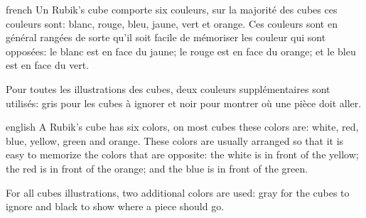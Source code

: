 \documentclass[0_Main.tex]{subfiles}
\begin{document}
\begin{shownto}{french}
Un Rubik's cube comporte six couleurs, sur la majorité des cubes ces couleurs sont: \colorbox{cblack}{\textcolor{cwhite}{blanc}}, \textcolor{cred}{rouge}, \textcolor{cblue}{bleu}, \textcolor{cyellow}{jaune}, \textcolor{cgreen}{vert} et \textcolor{corange}{orange}. Ces couleurs sont en général rangées de sorte qu'il soit facile de mémoriser les couleur qui sont opposées: le \colorbox{cblack}{\textcolor{cwhite}{blanc}} est en face du \textcolor{cyellow}{jaune}; le \textcolor{cred}{rouge} est en face du \textcolor{corange}{orange}; et le \textcolor{cblue}{bleu} est en face du \textcolor{cgreen}{vert}.

Pour toutes les illustrations des cubes, deux couleurs supplémentaires sont utilisés: \textcolor{cgray}{gris} pour les cubes à ignorer et \textcolor{cblack}{noir} pour montrer où une pièce doit aller.
\end{shownto}

\begin{shownto}{english}
A Rubik's cube has six colors, on most cubes these colors are: \colorbox{cblack}{\textcolor{cwhite}{white}}, \textcolor{cred}{red}, \textcolor{cblue}{blue}, \textcolor{cyellow}{yellow}, \textcolor{cgreen}{green} and \textcolor{corange}{orange}. These colors are usually arranged so that it is easy to memorize the colors that are opposite: the \colorbox{cblack}{\textcolor{cwhite}{white}} is in front of the \textcolor{cyellow}{yellow}; the \textcolor{cred}{red} is in front of the \textcolor{corange}{orange}; and the \textcolor{cblue}{blue} is in front of the \textcolor{cgreen}{green}.

For all cubes illustrations, two additional colors are used: \textcolor{cgray}{gray} for the cubes to ignore and \textcolor{cblack}{black} to show where a piece should go.
\end{shownto}

\clearpage


\end{document}
